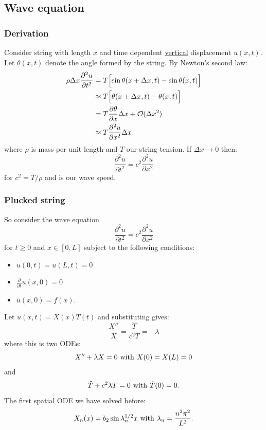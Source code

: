 \documentclass{article}
\begin{document}
\newpage

\subsection{Wave equation}

\subsubsection{Derivation}
Consider string with length $x$ and
time dependent \underline{vertical} displacement $u(x,t)$.
Let $\theta(x,t)$ denote the angle formed by the string.
By Newton's second law:
\begin{align*}
    \rho\Delta x\frac{\partial^2u}{\partial t^2}
    &=T\Bigl[\sin\theta(x+\Delta x,t)
    -\sin\theta(x,t)\Bigr] \\
    &\approx T\Bigl[\theta(x+\Delta x,t)-\theta(x,t)\Bigr] \\
    &=T\frac{\partial\theta}{\partial x}\Delta x
    +\mathcal{O}(\Delta x^2) \\
    &\approx T\frac{\partial^2u}{\partial x^2}\Delta x
\end{align*}
where $\rho$ is mass per unit length and $T$ our string tension.
If $\Delta x\rightarrow0$ then:
$$\frac{\partial^2u}{\partial t^2}=c^2\frac{\partial^2u}{\partial x^2}$$
for $c^2=T/\rho$ and is our wave speed.

\subsubsection{Plucked string}
So consider the wave equation
$$\frac{\partial^2u}{\partial t^2}=c^2\frac{\partial^2u}{\partial x^2}$$
for $t\geq0$ and $x\in[0,L]$ subject to the following conditions:
\begin{itemize}
    \item $u(0,t)=u(L,t)=0$
    \item $\displaystyle\frac{\partial}{\partial t}
    u(x,0)=0$
    \item $u(x,0)=f(x)$.
\end{itemize}
Let $u(x,t)=X(x)T(t)$ and substituting gives:
$$\frac{X''}{X}=\frac{\ddot{T}}{c^2 T}=-\lambda$$
where this is two ODEs:
$$X''+\lambda X=0
\hspace{0.05in}\text{with}\hspace{0.05in}
X(0)=X(L)=0$$
and
$$\ddot{T}+c^2\lambda T=0
\hspace{0.05in}\text{with}\hspace{0.05in}
\dot{T}(0)=0.$$
The first spatial ODE we have solved before:
$$X_n(x)=b_2\sin\lambda_n^{1/2}x
\hspace{0.05in}\text{with}\hspace{0.05in}
\lambda_n=\frac{n^2\pi^2}{L^2}.$$
\end{document}
